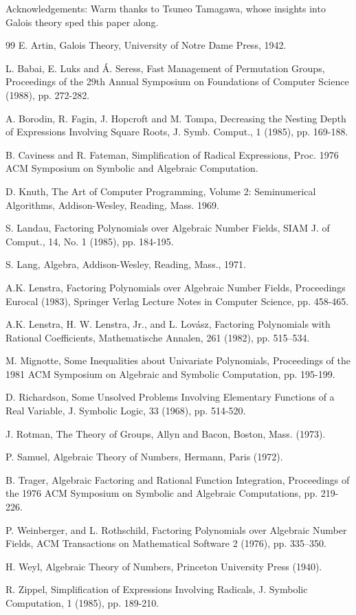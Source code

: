 \documentclass[11pt,letterpaper]{article}
\begin{document}
Acknowledgements: Warm thanks to Tsuneo Tamagawa, whose insights into Galois theory sped this paper along.

\begin{thebibliography}{99}
 E. Artin, Galois Theory, University of Notre Dame Press, 1942.

 L. Babai, E. Luks and Á. Seress, Fast Management of Permutation Groups, Proceedings of the 29th Annual Symposium on Foundations of Computer Science (1988), pp. 272-282.

 A. Borodin, R. Fagin, J. Hopcroft and M. Tompa, Decreasing the Nesting Depth of Expressions Involving Square Roots, J. Symb. Comput., 1 (1985), pp. 169-188.

 B. Caviness and R. Fateman, Simplification of Radical Expressions, Proc. 1976 ACM Symposium on Symbolic and Algebraic Computation.

 D. Knuth, The Art of Computer Programming, Volume 2: Seminumerical Algorithms, Addison-Wesley, Reading, Mass. 1969.

 S. Landau, Factoring Polynomials over Algebraic Number Fields, SIAM J. of Comput., 14, No. 1 (1985), pp. 184-195.

 S. Lang, Algebra, Addison-Wesley, Reading, Mass., 1971.

 A.K. Lenstra, Factoring Polynomials over Algebraic Number Fields, Proceedings Eurocal (1983), Springer Verlag Lecture Notes in Computer Science, pp. 458-465.

 A.K. Lenstra, H. W. Lenstra, Jr., and L. Lovász, Factoring Polynomials with Rational Coefficients, Mathematische Annalen, 261 (1982), pp. 515--534.

 M. Mignotte, Some Inequalities about Univariate Polynomials, Proceedings of the 1981 ACM Symposium on Algebraic and Symbolic Computation, pp. 195-199.

 D. Richardson, Some Unsolved Problems Involving Elementary Functions of a Real Variable, J. Symbolic Logic, 33 (1968), pp. 514-520.

 J. Rotman, The Theory of Groups, Allyn and Bacon, Boston, Mass. (1973).

 P. Samuel, Algebraic Theory of Numbers, Hermann, Paris (1972).

 B. Trager, Algebraic Factoring and Rational Function Integration, Proceedings of the 1976 ACM Symposium on Symbolic and Algebraic Computations, pp. 219-226.

 P. Weinberger, and L. Rothschild, Factoring Polynomials over Algebraic Number Fields, ACM Transactions on Mathematical Software 2 (1976), pp. 335--350.

 H. Weyl, Algebraic Theory of Numbers, Princeton University Press (1940).

 R. Zippel, Simplification of Expressions Involving Radicals, J. Symbolic Computation, 1 (1985), pp. 189-210.
\end{thebibliography}
\end{document}
